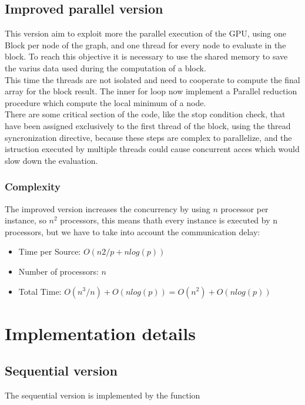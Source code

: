 \documentclass[
	a4paper, %
	12pt, %
]{class}
\begin{document}
\subsection{Improved parallel version}
This version aim to exploit more the parallel execution of the GPU, using one Block per node of the graph, and one thread for every node to evaluate in the block.
To reach this objective it is necessary to use the shared memory to save the varius data used during the computation of a block.\\

This time the threads are not isolated and need to cooperate to compute the final array for the block result.
The inner for loop now implement a Parallel reduction procedure which compute the local minimum of a node.\\

There are some critical section of the code, like the stop condition check, that have been assigned exclusively to the first thread of the block,
using the thread syncronization directive, because these steps are complex to parallelize, and the istruction executed by multiple threads could
cause concurrent acces which would slow down the evaluation.

\subsubsection{Complexity}
The improved version increases the concurrency by using $n$ processor per instance, so $n^2$ processors, this means thath every instance is executed
by n processors, but we have to take into account the communication delay:\\
\begin{itemize}
    \item Time per Source: $O(n2/p + nlog(p))$
    \item Number of processors: $n$
    \item Total Time: $O(n^3 / n) + O(nlog(p)) = O(n^2) + O(nlog(p))$\\
\end{itemize}

\newpage
\section{Implementation details}

\subsection{Sequential version}
The sequential version is implemented by the function
\end{document}
